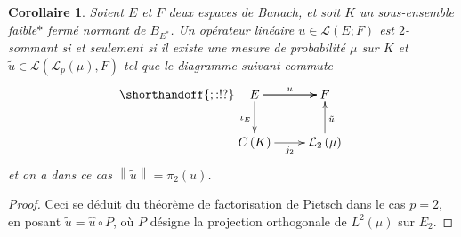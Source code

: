 \documentclass{smfart}
\theoremstyle{plain}
\newtheorem{corollary}[theorem]{Corollaire}
\theoremstyle{definition}
\newcommand {\ELL} {{\mathcal L}}
\newcommand {\BOUNDED} {{\mathcal L}}
\begin{document}
\begin{corollary} \label{cor:pietsch}
  Soient $E$ et $F$ deux espaces de Banach, et soit $K$ un
  sous-ensemble faible$ *$ fermé normant de $B_{E^*}$. Un
  opérateur linéaire $u \in \BOUNDED(E; F)$ est $2$-sommant si et
  seulement si il existe une mesure de probabilité $\mu$ sur $K$ et
  $\tilde{u}\in \mathcal{L}\left(\ELL_p\left(\mu\right),F\right)$ tel que
  le diagramme suivant commute
 \[
 \shorthandoff{;:!?}\xymatrix{
 E \ar[r]^u \ar[d]_{\iota_E} \ar[r] &F\\
 C\left(K\right) \ar[r]_{j_2} &\ELL_2\left(\mu\right) \ar[u]_{\tilde{u}}
 }
 \]
 et on a dans ce cas $\left\|\tilde{u}\right\|=\pi_2\left(u\right)$.
\end{corollary}

\begin{proof} Ceci se déduit du théorème de factorisation de
  Pietsch dans le cas $p=2$, en posant $\tilde u = \hat u \circ P$,
  où $P$ désigne la projection orthogonale de $L^2(\mu)$ sur
  $E_2$.
\end{proof}

%
% 
\end{document}
